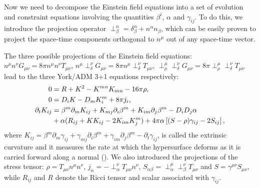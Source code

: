 Now we need to decompose the Einstein field equations into a set of evolution and constraint equations involving the quantities $\beta^i$, $\alpha$ and $\gamma_{ij}$. To do this, we introduce the projection operator $\perp^{\alpha}_{\beta} = \delta^{\alpha}_{\beta} + n^{\alpha} n_{\beta}$, which can be easily proven to project the space-time components orthogonal to $n^{\mu}$ out of any space-time vector.

The three possible projections of the Einstein field equations: $n^{\mu} n^{\nu} G_{\mu\nu} = 8\pi n^{\mu} n^{\nu} T_{\mu\nu}$, $n^{\mu}\perp^{\nu}_{\delta}G_{\mu\nu} = 8\pi n^{\mu} \perp^{\nu}_{\delta} T_{\mu\nu}$, $\perp^{\mu}_{\rho} \perp^{\nu}_{\delta} G_{\mu\nu} = 8\pi \perp^{\mu}_{\rho} \perp^{\nu}_{\delta} T_{\mu\nu}$ lead to the three York/ADM 3+1 equations respectively:
%
\begin{align}
0 &= R + K^{2} - K^{mn}K_{mn} -16\pi\rho,\label{eq:3p1_a} \\
0 &= D_iK - D_mK^m_i + 8\pi j_i,\label{eq:3p1_b} \\
\partial_t K_{ij} &= \beta^m\partial_mK_{ij} + K_{mj}\partial_i\beta^m + K_{im}\partial_j\beta^m - D_iD_j\alpha \label{eq:3p1_c}\\ 
&+ \alpha(R_{ij}+KK_{ij}-2K_{im}K^m_{j})+4\pi\alpha\left[(S-\rho)\gamma_{ij}-2S_{ij}\right]\notag,
\end{align}
where $K_{ij} = \beta^m\partial_m\gamma_{ij} + \gamma_{mj}\partial_{i}\beta^{m} + \gamma_{im}\partial_j\beta^{m}-\partial_{t}\gamma_{ij}$, is called the extrinsic curvature and it measures
the rate at which the hypersurface deforms as it is carried forward along a normal (\cite{baumgarte2010numerical}). We also introduced the projections of the stress tensor: $\rho = T_{\mu\nu} n^{\mu} n^{\nu}$, $j_{\alpha}= -\perp^{\nu}_{\alpha} T_{\mu\nu} n^{\nu}$, $S_{\alpha\beta} = \perp^{\mu}_{\alpha} \perp^{\nu}_{\beta} T_{\mu\nu}$ and $S=\gamma^{\mu\nu} S_{\mu\nu}$, while $R_{ij}$ and $R$ denote the Ricci tensor and scalar associated with $\gamma_{ij}$.

